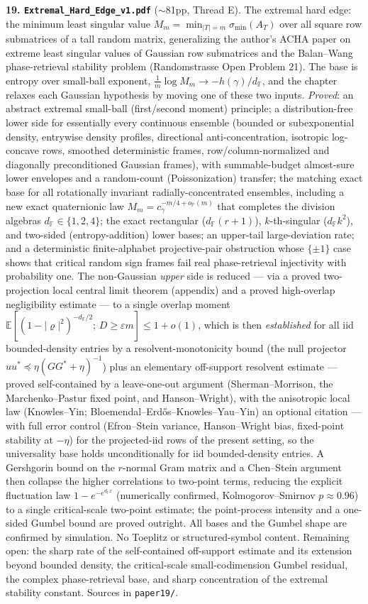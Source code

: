 \documentclass[11pt]{article}
\newcommand{\F}{\mathbb{F}}
\newcommand{\PP}{\mathbb{P}}
\begin{document}
\textbf{19. \texttt{Extremal\_Hard\_Edge\_v1.pdf}} ($\sim$81pp, Thread E).
The extremal hard edge: the minimum least singular value
$M_m=\min_{|T|=m}\sigma_{\min}(A_T)$ over all square row submatrices of a tall
random matrix, generalizing the author's ACHA paper on extreme least singular
values of Gaussian row submatrices and the Balan--Wang phase-retrieval stability
problem (Randomstrasse Open Problem 21).  The base is entropy over small-ball
exponent, $\tfrac1m\log M_m\to-h(\gamma)/d_\F$, and the chapter relaxes each
Gaussian hypothesis by moving one of these two inputs.  \emph{Proved}: an abstract
extremal small-ball (first/second moment) principle; a distribution-free lower
side for essentially every continuous ensemble (bounded or subexponential
density, entrywise density profiles, directional anti-concentration, isotropic
log-concave rows, smoothed deterministic frames, row/column-normalized and
diagonally preconditioned Gaussian frames), with summable-budget almost-sure
lower envelopes and a random-count (Poissonization) transfer; the matching exact
base for all rotationally invariant radially-concentrated ensembles, including a
new exact quaternionic law $M_m=c_\gamma^{-m/4+o_\PP(m)}$ that completes the
division algebras $d_\F\in\{1,2,4\}$; the exact rectangular ($d_\F(r{+}1)$),
$k$-th-singular ($d_\F k^2$), and two-sided (entropy-addition) lower bases; an
upper-tail large-deviation rate; and a deterministic finite-alphabet
projective-pair obstruction whose $\{\pm1\}$ case shows that critical random sign
frames fail real phase-retrieval injectivity with probability one.  The
non-Gaussian \emph{upper} side is reduced --- via a proved two-projection local
central limit theorem (appendix) and a proved high-overlap negligibility estimate
--- to a single overlap moment
$\mathbb E[(1-|\varrho|^2)^{-d_\F/2};\,D\ge\varepsilon m]\le1+o(1)$, which is then
\emph{established} for all iid bounded-density entries by a resolvent-monotonicity
bound (the null projector $uu^*\preceq\eta(GG^*+\eta)^{-1}$) plus an elementary
off-support resolvent estimate --- proved self-contained by a leave-one-out argument
(Sherman--Morrison, the Marchenko--Pastur fixed point, and Hanson--Wright), with the
anisotropic local law (Knowles--Yin; Bloemendal--Erd\H{o}s--Knowles--Yau--Yin) an
optional citation --- with full error control (Efron--Stein variance, Hanson--Wright bias, fixed-point
stability at $-\eta$) for the projected-iid rows of the present setting, so the universality base holds
unconditionally for iid bounded-density entries.  A Gershgorin bound on the
$r$-normal Gram matrix and a Chen--Stein argument then collapse the higher
correlations to two-point terms, reducing the explicit fluctuation law
$1-e^{-e^{d_\F x}}$ (numerically confirmed, Kolmogorov--Smirnov $p\approx0.96$) to a
single critical-scale two-point estimate; the point-process intensity and a
one-sided Gumbel bound are proved outright.  All bases and the Gumbel shape are
confirmed by simulation.  No Toeplitz or structured-symbol content.  Remaining open:
the sharp rate of the self-contained off-support estimate and its extension beyond
bounded density, the critical-scale small-codimension Gumbel residual, the complex phase-retrieval base,
and sharp concentration of the extremal stability constant.  Sources in
\texttt{paper19/}.
\end{document}
